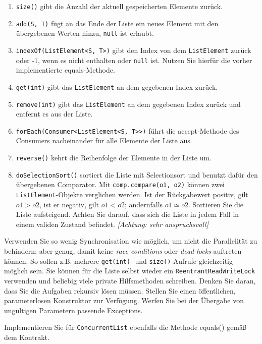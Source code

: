 \documentclass[11pt]{article} %
\begin{document}
\begin{enumerate}
\item \texttt{size()} gibt die Anzahl der aktuell gespeicherten Elemente zurück.
\item \texttt{add(S, T)} fügt an das Ende der Liste ein neues Element mit den übergebenen Werten hinzu, \texttt{null} ist erlaubt.
\item \texttt{indexOf(ListElement<S, T>)} gibt den Index von dem \texttt{ListElement} zurück oder -1, wenn es nicht enthalten oder \texttt{null} ist. Nutzen Sie hierfür die vorher implementierte equals-Methode.
\item \texttt{get(int)} gibt das \texttt{ListElement} an dem gegebenen Index zurück.
\item \texttt{remove(int)} gibt das \texttt{ListElement} an dem gegebenen Index zurück und entfernt es aus der Liste.
\item \texttt{forEach(Consumer<ListElement<S, T>>)} führt die accept-Methode des Consumers nacheinander für alle Elemente der Liste aus.
\item \texttt{reverse()} kehrt die Reihenfolge der Elemente in der Liste um.
\item \texttt{doSelectionSort()} sortiert die Liste mit Selectionsort und benutzt dafür den übergebenen Comparator. Mit \texttt{comp.compare(o1, o2)} können zwei \texttt{ListElement}-Objekte verglichen werden. Ist der Rückgabewert positiv, gilt $o1 > o2$, ist er negativ, gilt $o1 < o2$; andernfalls $o1 \simeq o2$. Sortieren Sie die Liste aufsteigend. Achten Sie darauf, dass sich die Liste in jedem Fall in einem validen Zustand befindet. \hspace*{\fill}\emph{[Achtung: sehr anspruchsvoll]}
\end{enumerate}
Verwenden Sie so wenig Synchronisation wie möglich, um nicht die Parallelität zu behindern; aber genug, damit keine \emph{race-conditions} oder \emph{dead-locks} auftreten können. So sollen z.B. mehrere \texttt{get(int)}- und \texttt{size()}-Aufrufe gleichzeitig möglich sein. Sie können für die Liste selbst wieder ein \texttt{ReentrantReadWriteLock} verwenden und beliebig viele private Hilfsmethoden schreiben. Denken Sie daran, dass Sie die Aufgaben rekursiv lösen müssen. Stellen Sie einen öffentlichen, parameterlosen Konstruktor zur Verfügung. Werfen Sie bei der Übergabe von ungültigen Parametern passende Exceptions.\par
Implementieren Sie für \texttt{ConcurrentList} ebenfalls die Methode equals() gemäß dem Kontrakt.

\printbibliography
\end{document}

